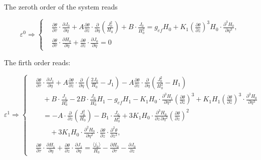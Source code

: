 The zeroth order of the system reads


\begin{equation}
\varepsilon^0 \Rightarrow 
\left\{
\begin{aligned}
&\frac{\partial \theta}{\partial \tau} \cdot \frac{\partial J_0}{\partial \eta}
+ A \frac{\partial \theta}{\partial z} \cdot \frac{\partial}{\partial \eta} \left( \frac{J_0^2}{H_0} \right)
+ B \cdot \frac{J_0}{H_0^2}
= g_{\mathit{ef}} H_0 + K_1 \left( \frac{\partial \theta}{\partial z} \right)^3 H_0 \cdot \frac{\partial^3 H_0}{\partial \eta^3},
\\[1ex]
&\frac{\partial \theta}{\partial \tau} \cdot \frac{\partial H_0}{\partial \eta}
+ \frac{\partial \theta}{\partial z} \cdot \frac{\partial J_0}{\partial \eta}
= 0
\end{aligned}
\right.
\end{equation}

The firth order reads:

\begin{equation}
\varepsilon^1 \Rightarrow
\left\{
\begin{aligned}
&\frac{\partial \theta}{\partial \tau} \cdot \frac{\partial J_1}{\partial \eta}
+ A \frac{\partial \theta}{\partial z} \cdot \frac{\partial}{\partial \eta} \left( \frac{2J_0}{H_0} - J_1 \right)
- A \frac{\partial \theta}{\partial z} \cdot \frac{\partial}{\partial \eta} \left( \frac{J_0^2}{H_0^2} - H_1 \right) \\
&\quad + B \cdot \frac{J_1}{H_0^2}
- 2B \cdot \frac{J_0}{H_0^3} H_1
- g_{\mathit{ef}} H_1
- K_1 H_0 \cdot \frac{\partial^3 H_1}{\partial \eta^3} \left( \frac{\partial \theta}{\partial z} \right)^3
+ K_1 H_1 \left( \frac{\partial \theta}{\partial z} \right)^3 \cdot \frac{\partial^3 H_0}{\partial \eta^3} \\
&\quad = - A \cdot \frac{\partial}{\partial z} \left( \frac{J_0^2}{H_0} \right)
- B_1 \cdot \frac{J_0}{H_0^2}
+ 3K_1 H_0 \cdot \frac{\partial^3 H_0}{\partial z\, \partial \eta^2} \left( \frac{\partial \theta}{\partial z} \right)^2 \\
&\qquad + 3K_1 H_0 \cdot \frac{\partial^2 H_0}{\partial \eta^2} \cdot \frac{\partial \theta}{\partial z} \cdot \frac{\partial^2 \theta}{\partial z^2}, \\[1.5ex]
&\frac{\partial \theta}{\partial \tau} \cdot \frac{\partial H_1}{\partial \eta}
+ \frac{\partial \theta}{\partial z} \cdot \frac{\partial J_1}{\partial \eta}
= \frac{\langle j_0 \rangle}{H_0}
- \frac{\partial H_0}{\partial \tau}
- \frac{\partial J_0}{\partial z}
\end{aligned}
\right.
\end{equation}

